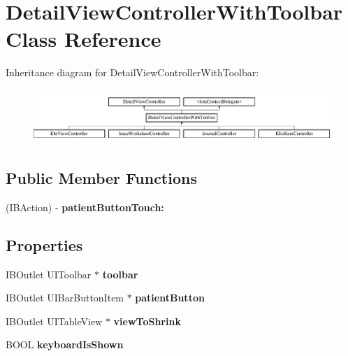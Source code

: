 \hypertarget{interface_detail_view_controller_with_toolbar}{
\section{DetailViewControllerWithToolbar Class Reference}
\label{interface_detail_view_controller_with_toolbar}
}
Inheritance diagram for DetailViewControllerWithToolbar:\begin{figure}[H]
\begin{center}
\leavevmode
\includegraphics[height=2.068965cm]{interface_detail_view_controller_with_toolbar}
\end{center}
\end{figure}
\subsection*{Public Member Functions}
\begin{DoxyCompactItemize}
\item 
\hypertarget{interface_detail_view_controller_with_toolbar_a5f97d4448ddef603729522aed64b9e67}{
(IBAction) -\/ {\bfseries patientButtonTouch:}}
\label{interface_detail_view_controller_with_toolbar_a5f97d4448ddef603729522aed64b9e67}

\end{DoxyCompactItemize}
\subsection*{Properties}
\begin{DoxyCompactItemize}
\item 
\hypertarget{interface_detail_view_controller_with_toolbar_a9559e681488942f824769cd85e9f0e09}{
IBOutlet UIToolbar $\ast$ {\bfseries toolbar}}
\label{interface_detail_view_controller_with_toolbar_a9559e681488942f824769cd85e9f0e09}

\item 
\hypertarget{interface_detail_view_controller_with_toolbar_a5763e5374f485b2cd8d3ddc97bec8f04}{
IBOutlet UIBarButtonItem $\ast$ {\bfseries patientButton}}
\label{interface_detail_view_controller_with_toolbar_a5763e5374f485b2cd8d3ddc97bec8f04}

\item 
\hypertarget{interface_detail_view_controller_with_toolbar_a144260c7bc367e2dc59d2ae6b8f02794}{
IBOutlet UITableView $\ast$ {\bfseries viewToShrink}}
\label{interface_detail_view_controller_with_toolbar_a144260c7bc367e2dc59d2ae6b8f02794}

\item 
\hypertarget{interface_detail_view_controller_with_toolbar_a8a9d12be4ab5cb99e5587c2f06f9f3d6}{
BOOL {\bfseries keyboardIsShown}}
\label{interface_detail_view_controller_with_toolbar_a8a9d12be4ab5cb99e5587c2f06f9f3d6}

\end{DoxyCompactItemize}


